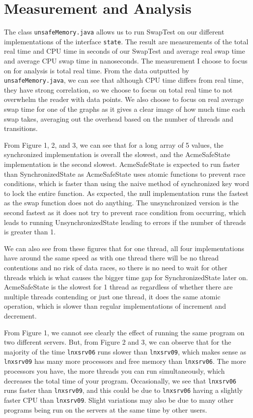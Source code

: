 \section{Measurement and Analysis}
The class \texttt{unsafeMemory.java} allows us to run SwapTest on our different implementations of the interface \texttt{state}. The result are measurements of the total real time and CPU time in seconds of our SwapTest and average real swap time and average CPU swap time in nanoseconds. The measurement I choose to focus on for analysis is total real time. From the data outputted by \texttt{unsafeMemory.java}, we can see that although CPU time differs from real time, they have strong correlation, so we choose to focus on total real time to not overwhelm the reader with data points. We also choose to focus on real average swap time for one of the graphs as it gives a clear image of how much time each swap takes, averaging out the overhead based on the number of threads and transitions. \par
From Figure 1, 2, and 3, we can see that for a long array of 5 values, the synchronized implementation is overall the slowest, and the AcmeSafeState implementation is the second slowest. AcmeSafeState is expected to run faster than SynchronizedState as AcmeSafeState uses atomic functions to prevent race conditions, which is faster than using the naive method of synchronized key word to lock the entire function. As expected, the null implementation runs the fastest as the swap function does not do anything. The unsynchronized version is the second fastest as it does not try to prevent race condition from occurring, which leads to running UnsynchronizedState leading to errors if the number of threads is greater than 1. \par
We can also see from these figures that for one thread, all four implementations have around the same speed as with one thread there will be no thread contentions and no risk of data races, so there is no need to wait for other threads which is what causes the bigger time gap for SynchronizedState later on. AcmeSafeState is the slowest for 1 thread as regardless of whether there are multiple threads contending or just one thread, it does the same atomic operation, which is slower than regular implementations of increment and decrement. \par 
From Figure 1, we cannot see clearly the effect of running the same program on two different servers. But, from Figure 2 and 3, we can observe that for the majority of the time \texttt{lnxsrv06} runs slower than \texttt{lnxsrv09}, which makes sense as \texttt{lnxsrv09} has many more processors and free memory than \texttt{lnxsrv06}. The more processors you have, the more threads you can run simultaneously, which decreases the total time of your program. Occasionally, we see that \texttt{lnxsrv06} runs faster than \texttt{lnxsrv09}, and this could be due to \texttt{lnxsrv06} having a slightly faster CPU than \texttt{lnxsrv09}. Slight variations may also be due to many other programs being run on the servers at the same time by other users. \par
